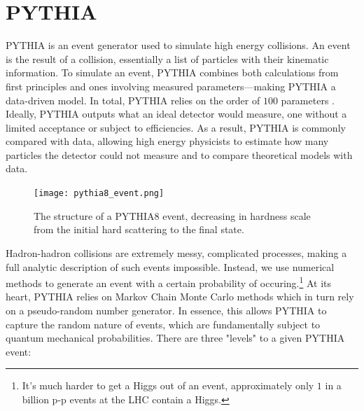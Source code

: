 \documentclass[../main.tex]{subfiles}
\begin{document}
\clearpage
\section{PYTHIA} \label{sxn:pythia}
PYTHIA is an event generator used to simulate high energy collisions. An event is the result of a collision, essentially a list of particles with their kinematic information. To simulate an event, PYTHIA combines both calculations from first principles and ones involving measured parameters---making PYTHIA a data-driven model. In total, PYTHIA relies on the order of $100$ parameters \cite{Bierlich:2022pfr}. Ideally, PYTHIA outputs what an ideal detector would measure, one without a limited acceptance or subject to efficiencies. As a result, PYTHIA is commonly compared with data, allowing high energy physicists to estimate how many particles the detector could not measure and to compare theoretical models with data. 

\begin{figure}[h]
    \texttt{[image: pythia8\_event.png]}
    \centering
    \caption{The structure of a PYTHIA8 event, decreasing in hardness scale from the initial hard scattering to the final state.}
    \label{fig:pythia}
\end{figure}




Hadron-hadron collisions are extremely messy, complicated processes, making a full analytic description of such events impossible. Instead, we use numerical methods to generate an event with a certain probability of occuring.\footnote{It's much harder to get a Higgs out of an event, approximately only $1$ in a billion p-p events at the LHC contain a Higgs.} At its heart, PYTHIA relies on Markov Chain Monte Carlo methods which in turn rely on a pseudo-random number generator. In essence, this allows PYTHIA to capture the random nature of events, which are fundamentally subject to quantum mechanical probabilities. There are three "levels" to a given PYTHIA event:
\end{document}
